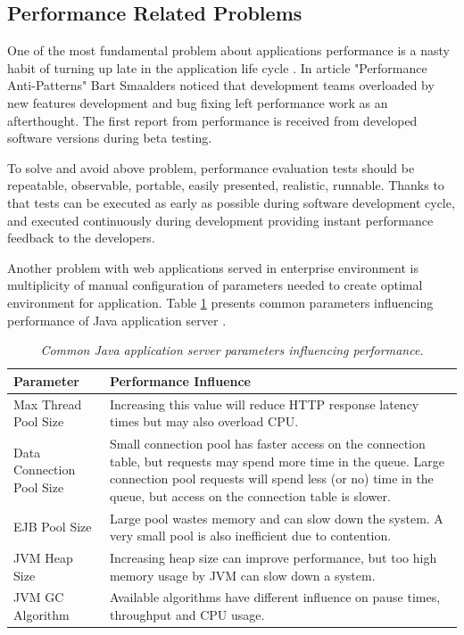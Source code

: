 \documentclass[10pt,a4paper]{article}
\begin{document}
\subsection{Performance Related Problems} \label{PerformanceRelatedProblems}
One of the most fundamental problem about applications performance is a nasty habit of turning up late in the application life cycle \cite{artperformance}. In article "Performance Anti-Patterns" \cite{lssrarticle} Bart Smaalders noticed that development teams overloaded by new features development and bug fixing left performance work as an afterthought. The first report from performance is received from developed software versions during beta testing.

To solve and avoid above problem, performance evaluation tests should be repeatable, observable, portable, easily presented, realistic, runnable. Thanks to that tests can be executed as early as possible during software development cycle, and executed continuously during development providing instant performance feedback to the developers. 

Another problem with web applications served in enterprise environment is multiplicity of manual configuration of parameters needed to create optimal environment for application. Table \ref{glassfishparams} presents common parameters influencing performance of Java application server \cite{glassfishdoc} \cite{deployerproblem}.  

\begin{table}[!htb]
\caption{\textit{Common Java application server parameters influencing performance.}}
\def\arraystretch{1.5}
\begin{tabularx}{\textwidth}{l|X}
  \textbf{Parameter} & \textbf{Performance Influence} \\
\hline
Max Thread Pool Size & Increasing this value will reduce HTTP response latency times but may also overload CPU.\\
 
Data Connection Pool Size & Small connection pool has faster access on the connection table, but requests may spend more time in the queue. Large connection pool requests will spend less (or no) time in the 
queue, but access on the connection table is slower.\\

EJB Pool Size & Large pool wastes memory and  can slow down the system. A very small pool is also inefficient due to contention. \\

JVM Heap Size & Increasing heap size can improve performance, but too high memory usage by JVM can slow down a system.   \\

JVM GC Algorithm & Available algorithms have different influence on pause 
times, throughput and CPU usage.
\end{tabularx}
\label{glassfishparams}
\end{table}
\end{document}
